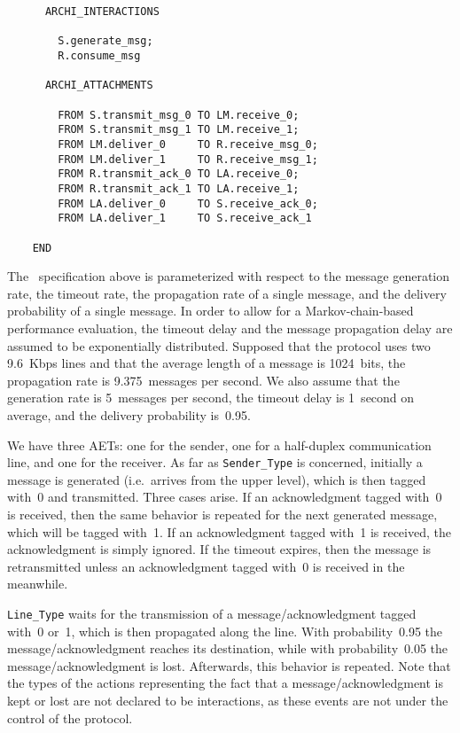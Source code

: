 \begin{verbatim}
      ARCHI_INTERACTIONS

        S.generate_msg;
        R.consume_msg

      ARCHI_ATTACHMENTS

        FROM S.transmit_msg_0 TO LM.receive_0;
        FROM S.transmit_msg_1 TO LM.receive_1;
        FROM LM.deliver_0     TO R.receive_msg_0;
        FROM LM.deliver_1     TO R.receive_msg_1;
        FROM R.transmit_ack_0 TO LA.receive_0;
        FROM R.transmit_ack_1 TO LA.receive_1;
        FROM LA.deliver_0     TO S.receive_ack_0;
        FROM LA.deliver_1     TO S.receive_ack_1

    END
	\end{verbatim}

The \aemilia\ specification above is parameterized with respect to the message generation rate, the timeout
rate, the propagation rate of a single message, and the delivery probability of a single message. In order
to allow for a Markov-chain-based performance evaluation, the timeout delay and the message propagation
delay are assumed to be exponentially distributed. Supposed that the protocol uses two 9.6~Kbps lines and
that the average length of a message is 1024~bits, the propagation rate is 9.375~messages per second. We
also assume that the generation rate is 5~messages per second, the timeout delay is 1~second on average, and
the delivery probability is~0.95.

We have three AETs: one for the sender, one for a half-duplex communication line, and one for the receiver.
As far as {\tt Sender\_Type} is concerned, initially a message is generated (i.e.\ arrives from the upper
level), which is then tagged with~0 and transmitted. Three cases arise. If an acknowledgment tagged with~0
is received, then the same behavior is repeated for the next generated message, which will be tagged with~1.
If an acknowledgment tagged with~1 is received, the acknowledgment is simply ignored. If the timeout
expires, then the message is retransmitted unless an acknowledgment tagged with~0 is received in the
meanwhile.

{\tt Line\_Type} waits for the transmission of a message/acknowledgment tagged with~0 or~1, which is then
propagated along the line. With probability~0.95 the message/acknowledgment reaches its destination, while
with probability~0.05 the message/acknowledgment is lost. Afterwards, this behavior is repeated. Note that
the types of the actions representing the fact that a message/acknowledgment is kept or lost are not
declared to be interactions, as these events are not under the control of the protocol.

